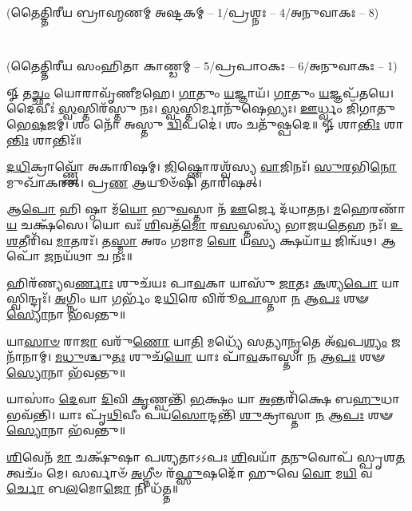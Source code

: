 
\vspace{-1ex}
\centerline{\scriptsize(𑌤𑍈𑌤𑍍𑌤𑌿𑌰𑍀𑌯 𑌬𑍍𑌰𑌾𑌹𑍍𑌮𑌣𑌮𑍍 𑌅𑌷𑍍𑌟𑌕𑌮𑍍 -- 1/𑌪𑍍𑌰𑌶𑍍𑌨𑌃 -- 4/𑌅𑌨𑍁𑌵𑌾𑌕𑌃 -- 8)}\mbox{}\\[-2em]
\centerline{\scriptsize(𑌤𑍈𑌤𑍍𑌤𑌿𑌰𑍀𑌯 𑌸𑌂𑌹𑌿𑌤𑌾 𑌕𑌾𑌣𑍍𑌡𑌮𑍍 -- 5/𑌪𑍍𑌰𑌪𑌾𑌠𑌕𑌃 -- 6/𑌅𑌨𑍁𑌵𑌾𑌕𑌃 -- 1)}


𑍐 𑌤\-\ul{𑌚𑍍𑌛𑌂} 𑌯𑍋𑌰𑌾𑌵𑍃᳴𑌣𑍀𑌮𑌹𑍇। \ul{𑌗𑌾}\-𑌤𑍁𑌂 \ul{𑌯}\-𑌜𑍍𑌞𑌾𑌯᳴। \ul{𑌗𑌾}\-𑌤𑍁𑌂 \ul{𑌯}\-𑌜𑍍𑌞𑌪᳴𑌤𑌯𑍇। 𑌦𑍈𑌵𑍀𑌃॑ \ul{𑌸𑍍𑌵}\-𑌸𑍍𑌤𑌿𑌰᳴𑌸𑍍𑌤𑍁 𑌨𑌃।
\-\ul{𑌸𑍍𑌵}\-𑌸𑍍𑌤𑌿𑌰𑍍𑌮𑌾𑌨𑍁᳴𑌷𑍇𑌭𑍍𑌯𑌃। \ul{𑌊}\-𑌰𑍍𑌧𑍍𑌵𑌂 𑌜𑌿᳴𑌗𑌾𑌤𑍁 𑌭𑍇\-\ul{𑌷}\-𑌜𑌮𑍍। 𑌶𑌂 𑌨𑍋᳴ 𑌅𑌸𑍍𑌤𑍁 \ul{𑌦𑍍𑌵𑌿}\-𑌪𑌦𑍇॑। 𑌶𑌂 𑌚𑌤𑍁᳴𑌷𑍍𑌪𑌦𑍇॥
𑍐 𑌶𑌾\-\ul{𑌨𑍍𑌤𑌿𑌃} 𑌶𑌾\-\ul{𑌨𑍍𑌤𑌿𑌃} 𑌶𑌾𑌨𑍍𑌤𑌿𑌃᳴॥

\-\ul{𑌦}\-\-\ul{𑌧𑌿}\-𑌕𑍍𑌰𑌾𑌵𑍍𑌣𑍍𑌣𑍋᳴ 𑌅𑌕𑌾𑌰𑌿𑌷𑌮𑍍। \ul{𑌜𑌿}\-𑌷𑍍𑌣𑍋𑌰𑌶𑍍𑌵᳴𑌸𑍍𑌯 \ul{𑌵𑌾}\-𑌜𑌿𑌨𑌃᳴।
\-\ul{𑌸𑍁}\-\-\ul{𑌰}\-𑌭𑌿\-\ul{𑌨𑍋} 𑌮𑍁𑌖𑌾᳴𑌕𑌰𑌤𑍍। 𑌪𑍍𑌰\-\ul{𑌣} 𑌆𑌯𑍂𑍞᳴𑌷𑌿 𑌤𑌾𑌰𑌿𑌷𑌤𑍍।

𑌆\-\ul{𑌪𑍋} 𑌹𑌿 𑌷𑍍𑌠𑌾 𑌮᳴\-\ul{𑌯𑍋} 𑌭𑍁\-\ul{𑌵}\-𑌸𑍍𑌤𑌾 𑌨᳴ \ul{𑌊}\-𑌰𑍍𑌜𑍇 𑌦᳴𑌧𑌾𑌤𑌨।
\-\ul{𑌮}\-𑌹𑍇𑌰𑌣𑌾᳴\-\ul{𑌯} 𑌚𑌕𑍍𑌷᳴𑌸𑍇। 𑌯𑍋 𑌵𑌃᳴ \ul{𑌶𑌿}\-𑌵𑌤᳴\-\ul{𑌮𑍋} 𑌰\-\ul{𑌸}\-𑌸𑍍𑌤𑌸𑍍𑌯᳴ 𑌭𑌾𑌜𑌯\-\ul{𑌤𑍇}\-𑌹 𑌨𑌃᳴।
\-\ul{𑌉}\-\-\ul{𑌶}\-𑌤𑍀𑌰𑌿᳴𑌵 \ul{𑌮𑌾}\-𑌤𑌰𑌃᳴। 𑌤\-\ul{𑌸𑍍𑌮𑌾} 𑌅𑌰𑌂 𑌗𑌮𑌾𑌮 \ul{𑌵𑍋} 𑌯\-\ul{𑌸𑍍𑌯} 𑌕𑍍𑌷𑌯𑌾᳴\-\ul{𑌯} 𑌜𑌿𑌨𑍍𑌵᳴𑌥।
𑌆𑌪𑍋᳴ \ul{𑌜}\-𑌨𑌯᳴𑌥𑌾 𑌚 𑌨𑌃॥

𑌹𑌿𑌰᳴𑌣𑍍𑌯𑌵\-\ul{𑌰𑍍𑌣𑌾𑌃} 𑌶𑍁𑌚᳴𑌯𑌃 𑌪𑌾\-\ul{𑌵}\-𑌕𑌾 𑌯𑌾𑌸𑍁᳴ \ul{𑌜𑌾}\-𑌤𑌃 \ul{𑌕}\-𑌶𑍍𑌯\-\ul{𑌪𑍋} 𑌯𑌾𑌸𑍍𑌵𑌿𑌨𑍍𑌦𑍍𑌰𑌃᳴।
\-\ul{𑌅}\-𑌗𑍍𑌨𑌿𑌂 𑌯𑌾 𑌗𑌰𑍍𑌭𑌂᳴ 𑌦\-\ul{𑌧𑌿}\-𑌰𑍇 𑌵𑌿𑌰𑍂᳴\-\ul{𑌪𑌾}\-𑌸𑍍𑌤𑌾 \ul{𑌨} 𑌆\-\ul{𑌪𑌃} 𑌶𑍟 \ul{𑌸𑍍𑌯𑍋}\-𑌨𑌾 𑌭᳴𑌵𑌨𑍍𑌤𑍁॥

𑌯𑌾\-\ul{𑌸𑌾}\-\-\ul{𑍞} 𑌰𑌾\-\ul{𑌜𑌾} 𑌵𑌰𑍁᳴\-\ul{𑌣𑍋} 𑌯𑌾\-\ul{𑌤𑌿} 𑌮𑌧𑍍𑌯𑍇᳴ 𑌸𑌤𑍍𑌯𑌾\-\ul{𑌨𑍃}\-𑌤𑍇 𑌅᳴\-\ul{𑌵}\-𑌪\-\ul{𑌶𑍍𑌯𑌂} 𑌜𑌨𑌾᳴𑌨𑌾𑌮𑍍।
\-\ul{𑌮}\-\-\ul{𑌧𑍁}\-𑌶𑍍𑌚𑍁\-\ul{𑌤𑌃} 𑌶𑍁𑌚᳴\-\ul{𑌯𑍋} 𑌯𑌾𑌃 𑌪𑌾᳴\-\ul{𑌵}\-𑌕𑌾𑌸𑍍𑌤𑌾 \ul{𑌨} 𑌆\-\ul{𑌪𑌃} 𑌶𑍟 \ul{𑌸𑍍𑌯𑍋}\-𑌨𑌾 𑌭᳴𑌵𑌨𑍍𑌤𑍁॥

𑌯𑌾𑌸𑌾𑌂॑ \ul{𑌦𑍇}\-𑌵𑌾 \ul{𑌦𑌿}\-𑌵𑌿 \ul{𑌕𑍃}\-𑌣𑍍𑌵𑌨𑍍𑌤𑌿᳴ \ul{𑌭}\-𑌕𑍍𑌷𑌂 𑌯𑌾 \ul{𑌅}\-𑌨𑍍𑌤𑌰𑌿᳴𑌕𑍍𑌷𑍇 𑌬\-\ul{𑌹𑍁}\-𑌧𑌾 𑌭𑌵᳴𑌨𑍍𑌤𑌿।
𑌯𑌾𑌃 𑌪𑍃᳴\-\ul{𑌥𑌿}\-𑌵𑍀𑌂 𑌪𑌯᳴\-\ul{𑌸𑍋}\-𑌨𑍍𑌦𑌨𑍍𑌤𑌿᳴ \ul{𑌶𑍁}\-𑌕𑍍𑌰𑌾𑌸𑍍𑌤𑌾 \ul{𑌨} 𑌆\-\ul{𑌪𑌃} 𑌶𑍟 \ul{𑌸𑍍𑌯𑍋}\-𑌨𑌾 𑌭᳴𑌵𑌨𑍍𑌤𑍁॥

\-\ul{𑌶𑌿}\-𑌵𑍇𑌨᳴ \ul{𑌮𑌾} 𑌚𑌕𑍍𑌷𑍁᳴𑌷𑌾 𑌪𑌶𑍍𑌯𑌤𑌾𑌽𑌽𑌪𑌃 \ul{𑌶𑌿}\-𑌵𑌯𑌾᳴ \ul{𑌤}\-𑌨𑍁𑌵𑍋𑌪᳴ 𑌸𑍍𑌪𑍃𑌶\-\ul{𑌤} 𑌤𑍍𑌵𑌚𑌂᳴ 𑌮𑍇।
𑌸𑌰𑍍𑌵𑌾𑍞᳴ \ul{𑌅}\-𑌗𑍍𑌨𑍀𑍞 𑌰᳴\-\ul{𑌫𑍍𑌸𑍁}\-𑌷𑌦𑍋᳴ 𑌹𑍁𑌵𑍇 \ul{𑌵𑍋} 𑌮\-\ul{𑌯𑌿} 𑌵\-\ul{𑌰𑍍𑌚𑍋} 𑌬\-\ul{𑌲}\-𑌮𑍋\-\ul{𑌜𑍋} 𑌨𑌿 𑌧᳴𑌤𑍍𑌤॥

